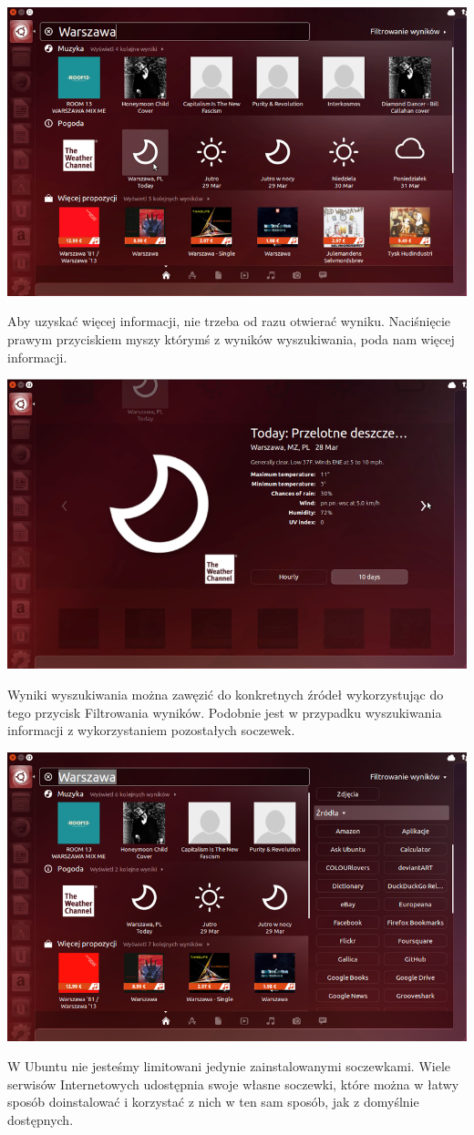 \begin{center}
	\includegraphics[scale=0.75]{images/unity_dash_wyszukiwanie.png}
\end{center}
\clearpage
Aby uzyskać więcej informacji, nie trzeba od razu otwierać wyniku. Naciśnięcie prawym przyciskiem myszy którymś z wyników wyszukiwania, poda nam więcej informacji.
\begin{center}
	\includegraphics[scale=0.75]{images/unity_dash_wyszukiwanie2.png}
\end{center}
\clearpage
Wyniki wyszukiwania można zawęzić do konkretnych źródeł wykorzystując do tego przycisk Filtrowania wyników. Podobnie jest w przypadku wyszukiwania informacji z wykorzystaniem pozostałych soczewek.
\begin{center}
	\includegraphics[scale=0.75]{images/unity_dash_wyszukiwanie3.png}
\end{center}

W Ubuntu nie jesteśmy limitowani jedynie zainstalowanymi soczewkami. Wiele serwisów Internetowych udostępnia swoje własne soczewki, które można w łatwy sposób doinstalować i korzystać z nich w ten sam sposób, jak z domyślnie dostępnych.
\clearpage


